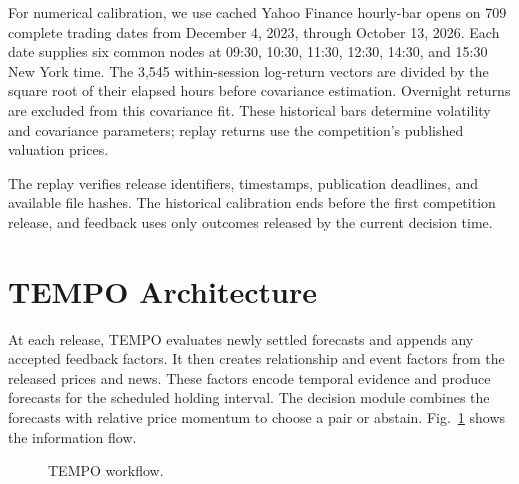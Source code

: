 \documentclass[conference]{IEEEtran}
\begin{document}
For numerical calibration, we use cached Yahoo Finance hourly-bar opens on 709 complete trading dates from December 4, 2023, through October 13, 2026. Each date supplies six common nodes at 09:30, 10:30, 11:30, 12:30, 14:30, and 15:30 New York time. The 3,545 within-session log-return vectors are divided by the square root of their elapsed hours before covariance estimation. Overnight returns are excluded from this covariance fit. These historical bars determine volatility and covariance parameters; replay returns use the competition's published valuation prices.

The replay verifies release identifiers, timestamps, publication deadlines, and available file hashes. The historical calibration ends before the first competition release, and feedback uses only outcomes released by the current decision time.

\section{TEMPO Architecture}
At each release, TEMPO evaluates newly settled forecasts and appends any accepted feedback factors. It then creates relationship and event factors from the released prices and news. These factors encode temporal evidence and produce forecasts for the scheduled holding interval. The decision module combines the forecasts with relative price momentum to choose a pair or abstain. Fig.~\ref{fig:architecture} shows the information flow.

\begin{figure}[t]
\centering
{}
\caption{TEMPO workflow.}
\label{fig:architecture}
\end{figure}
\end{document}

